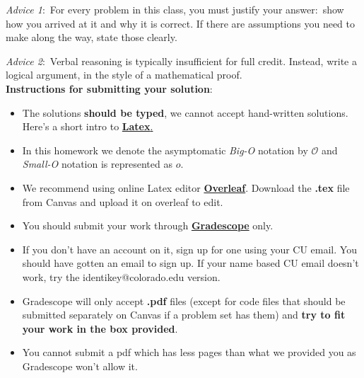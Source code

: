 \documentclass[12pt]{article}
\begin{document}
	\renewcommand{\headrulewidth}{0.5pt}
	
	\phantom{Test}
	
	\begin{small}
		\textit{Advice 1}:\ For every problem in this class, you must justify your answer:\ show how you arrived at it and why it is correct. If there are assumptions you need to make along the way, state those clearly.
		
		\textit{Advice 2}:\ Verbal reasoning is typically insufficient for full credit. Instead, write a logical argument, in the style of a mathematical proof.\\
		
		\textbf{Instructions for submitting your solution}:
		\vspace{-5mm} 
		
		\begin{itemize}
			\item The solutions \textbf{should be typed}, we cannot accept hand-written solutions. Here's a short intro to \href{http://ece.uprm.edu/~caceros/latex/introduction.pdf}{\textbf{Latex}.}
			\item In this homework we denote the asymptomatic \textit{Big-O} notation by $\mathcal{O}$ and \textit{Small-O} notation is represented as $o$. 
			\item We recommend using online Latex editor \href{https://www.overleaf.com/}{\textbf{Overleaf}}. Download the \textbf{.tex} file from Canvas and upload it on overleaf to edit.
			\item You should submit your work through \href{https://www.gradescope.com}{\textbf{Gradescope}}  only.
			\item If you don't have an account on it, sign up for one using your CU email. You should have gotten an email to sign up. If your name based CU email doesn't work, try the identikey@colorado.edu version. 
			\item Gradescope will only accept \textbf{.pdf} files (except for code files that should be submitted separately on Canvas if a problem set has them) and \textbf{try to fit your work in the box provided}. 
			\item You cannot submit a pdf which has less pages than what we provided you as Gradescope won't allow it.
			
		\end{itemize}
		\vspace{-4mm} 
	\end{small}
	
\end{document}
